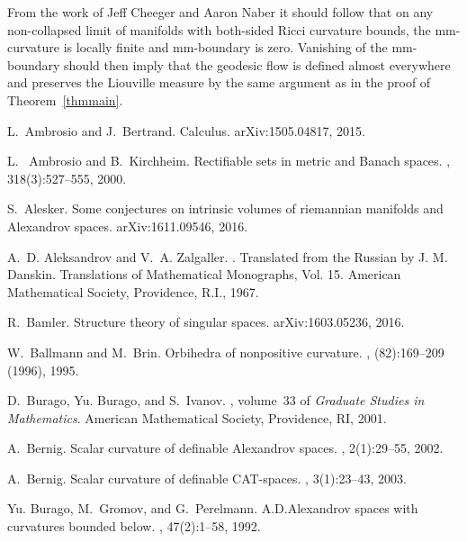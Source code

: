 \documentclass[12pt,leqno,intlimits]{amsart}
\numberwithin{equation}{section}
\theoremstyle{definition}
\theoremstyle{remark}
\begin{document}
From the work of Jeff Cheeger and Aaron Naber \cite{Ch-Na-codim4} it should follow that on any non-collapsed limit of manifolds with both-sided Ricci curvature bounds, the mm-curvature is locally finite and mm-boundary is zero.
Vanishing of the mm-boundary should then imply that the geodesic flow is defined almost everywhere and preserves the Liouville measure by the same argument as in the proof of Theorem~\ref{thmmain}.

%
\begin{thebibliography}{KMS01}

L.~Ambrosio and J.~Bertrand.
 {C}alculus.
\newblock arXiv:1505.04817, 2015.


L.~ Ambrosio and B.~Kirchheim.
\newblock Rectifiable sets in metric and {B}anach spaces.
, 318(3):527--555, 2000.

S.~Alesker.
\newblock Some conjectures on intrinsic volumes of riemannian manifolds and
{Alexandrov} spaces.
\newblock arXiv:1611.09546, 2016.

A.~D. Aleksandrov and V.~A. Zalgaller.
.
\newblock Translated from the Russian by J. M. Danskin. Translations of
Mathematical Monographs, Vol. 15. American Mathematical Society, Providence,
R.I., 1967.

R.~Bamler.
\newblock Structure theory of singular spaces.
\newblock arXiv:1603.05236, 2016.

W.~Ballmann and M.~Brin.
\newblock Orbihedra of nonpositive curvature.
, (82):169--209 (1996),
1995.

D.~Burago, Yu. Burago, and S.~Ivanov.
, volume~33 of {\em Graduate Studies
in Mathematics}.
\newblock American Mathematical Society, Providence, RI, 2001.

A.~Bernig.
\newblock Scalar curvature of definable {A}lexandrov spaces.
, 2(1):29--55, 2002.

A.~Bernig.
\newblock Scalar curvature of definable {CAT}-spaces.
, 3(1):23--43, 2003.

Yu. Burago, M.~Gromov, and G.~Perelmann.
\newblock A.{D}.{Alexandrov} spaces with curvatures bounded below.
, 47(2):1--58, 1992.


\end{thebibliography}
\end{document}
